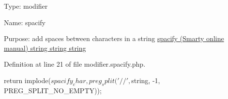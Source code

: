 \-Type\-: modifier\par
 \-Name\-: spacify\par
 \-Purpose\-: add spaces between characters in a string \hyperlink{}{spacify (\-Smarty online manual)  string  string  string }

\-Definition at line 21 of file modifier.\-spacify.\-php.


\begin{DoxyCode}
{
    return implode($spacify_char,
                   preg_split('//', $string, -1, PREG_SPLIT_NO_EMPTY));
}
\end{DoxyCode}
